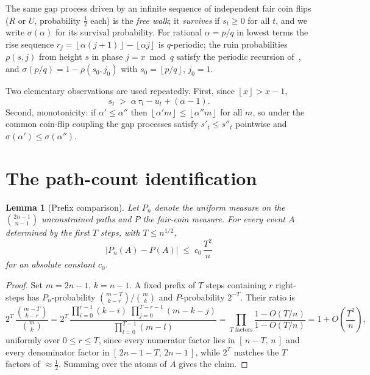 \documentclass[11pt]{article}
\newtheorem{lemma}[theorem]{Lemma}
\theoremstyle{definition}
\theoremstyle{remark}
\newcommand{\floor}[1]{\left\lfloor #1 \right\rfloor}
\begin{document}
The same gap process driven by an infinite sequence of independent
fair coin flips ($R$ or $U$, probability $\tfrac12$ each) is the
\emph{free walk}; it \emph{survives} if $s_t \geq 0$ for all $t$, and
we write $\sigma(\alpha)$ for its survival probability.
For rational $\alpha = p/q$ in lowest terms the rise sequence
$r_j = \floor{\alpha(j+1)} - \floor{\alpha j}$ is $q$-periodic; the
ruin probabilities $\rho(s, j)$ from height $s$ in phase
$j = x \bmod q$ satisfy the periodic recursion of~\cite{bridge}, and
$\sigma(p/q) = 1 - \rho(s_0, j_0)$ with $s_0 = \floor{p/q}$,
$j_0 = 1$.

Two elementary observations are used repeatedly.
First, since $\floor{x} > x - 1$,
\begin{equation}\label{eq:linbound}
s_t \;>\; \alpha\,\tau_t - u_t + (\alpha - 1) .
\end{equation}
Second, monotonicity: if $\alpha' \leq \alpha''$ then
$\floor{\alpha' m} \leq \floor{\alpha'' m}$ for all $m$, so under the
common coin-flip coupling the gap processes satisfy
$s'_t \leq s''_t$ pointwise and $\sigma(\alpha') \leq \sigma(\alpha'')$.

\section{The path-count identification}

\begin{lemma}[Prefix comparison]\label{lem:prefix}
Let $P_n$ denote the uniform measure on the $\binom{2n-1}{n-1}$
unconstrained paths and $P$ the fair-coin measure.
For every event $A$ determined by the first $T$ steps, with
$T \leq n^{1/2}$,
\[
\bigl|P_n(A) - P(A)\bigr| \;\leq\; c_0\,\frac{T^2}{n}
\]
for an absolute constant $c_0$.
\end{lemma}

\begin{proof}
Set $m = 2n-1$, $k = n-1$.
A fixed prefix of $T$ steps containing $r$ right-steps has
$P_n$-probability $\binom{m-T}{k-r}/\binom{m}{k}$ and $P$-probability
$2^{-T}$.
Their ratio is
\[
2^{T}\,\frac{\binom{m-T}{k-r}}{\binom{m}{k}}
= 2^{T}\,
\frac{\prod_{i=0}^{r-1}(k-i)\;\prod_{j=0}^{T-r-1}(m-k-j)}
     {\prod_{l=0}^{T-1}(m-l)}
= \prod_{\text{$T$ factors}}
\frac{1 - O(T/n)}{1 - O(T/n)}
= 1 + O\!\left(\frac{T^2}{n}\right),
\]
uniformly over $0 \leq r \leq T$, since every numerator factor lies in
$[\,n - T,\, n\,]$ and every denominator factor in
$[\,2n - 1 - T,\, 2n - 1\,]$, while $2^T$ matches the $T$ factors of
$\approx \tfrac12$.
Summing over the atoms of $A$ gives the claim.
\end{proof}
\end{document}
